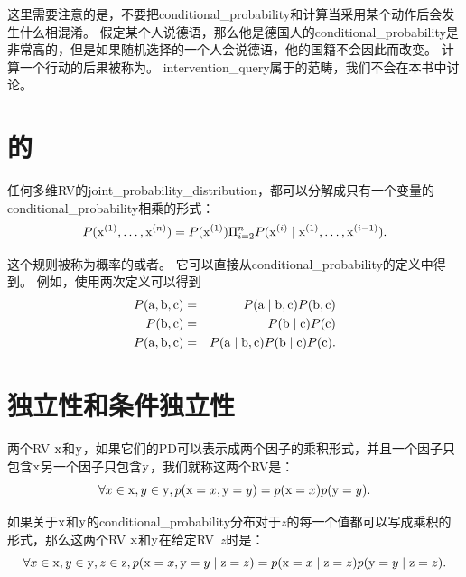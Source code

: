 这里需要注意的是，不要把\gls{conditional_probability}和计算当采用某个动作后会发生什么相混淆。
假定某个人说德语，那么他是德国人的\gls{conditional_probability}是非常高的，但是如果随机选择的一个人会说德语，他的国籍不会因此而改变。
计算一个行动的后果被称为。
\gls{intervention_query}属于的范畴，我们不会在本书中讨论。

\section{的}
\label{sec:the_chain_rule_of_conditional_probabilities}

任何多维\gls{RV}的\gls{joint_probability_distribution}，都可以分解成只有一个变量的\gls{conditional_probability}相乘的形式：
\begin{equation}
P(\mathrm{x}^{(1)}, \ldots, \mathrm{x}^{(n)}) = P(\mathrm{x}^{(1)}) \Pi_{i=2}^n P(\mathrm{x}^{(i)} \mid \mathrm{x}^{(1)}, \ldots, \mathrm{x}^{(i-1)}) .
\label{eq:chap3_chain_rule}
\end{equation}


这个规则被称为概率的或者。
它可以直接从\gls{conditional_probability}的定义中得到。
例如，使用两次定义可以得到
\begin{eqnarray*}
P(\mathrm{a}, \mathrm{b}, \mathrm{c}) &=& P(\mathrm{a} \mid \mathrm{b}, \mathrm{c}) P(\mathrm{b}, \mathrm{c})\\
P(\mathrm{b}, \mathrm{c}) &=& P(\mathrm{b} \mid \mathrm{c}) P(\mathrm{c})\\
P(\mathrm{a}, \mathrm{b}, \mathrm{c}) &=& P(\mathrm{a} \mid \mathrm{b}, \mathrm{c}) P(\mathrm{b} \mid \mathrm{c}) P(\mathrm{c}).
\end{eqnarray*}

\section{独立性和条件独立性}
\label{sec:independence_and_conditional_independence}

两个\gls{RV} $\mathrm{x}$和$\mathrm{y}$，如果它们的\gls{PD}可以表示成两个因子的乘积形式，并且一个因子只包含$\mathrm{x}$另一个因子只包含$\mathrm{y}$，我们就称这两个\gls{RV}是：
\begin{equation}
\forall x \in \mathrm{x}, y \in \mathrm{y}, p(\mathrm{x} = x, \mathrm{y} = y) = p(\mathrm{x} = x)p(\mathrm{y} = y).
\end{equation}

如果关于$\mathrm{x}$和$\mathrm{y}$的\gls{conditional_probability}分布对于$z$的每一个值都可以写成乘积的形式，那么这两个\gls{RV} $\mathrm{x}$和$\mathrm{y}$在给定\gls{RV}~$z$时是：
\begin{equation}
\forall x \in \mathrm{x}, y \in \mathrm{y}, z \in \mathrm{z}, p( \mathrm{x}=x, \mathrm{y}=y \mid \mathrm{z}=z) =
p(\mathrm{x} = x \mid \mathrm{z} = z) p(\mathrm{y} = y \mid \mathrm{z} = z).
\end{equation}

